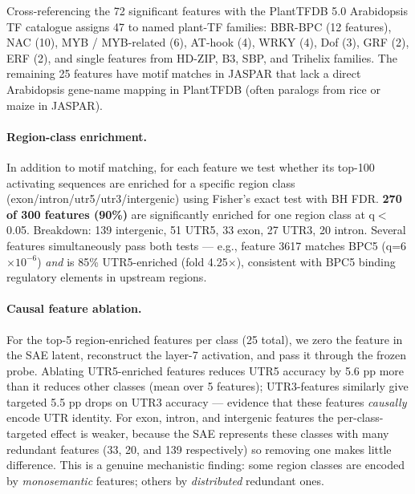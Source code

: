 \documentclass{article}
\begin{document}
Cross-referencing the 72 significant features with the PlantTFDB 5.0
Arabidopsis TF catalogue \citep{tian2020plantregmap} assigns 47 to named
plant-TF families: BBR-BPC (12 features), NAC (10), MYB / MYB-related (6),
AT-hook (4), WRKY (4), Dof (3), GRF (2), ERF (2), and single features from
HD-ZIP, B3, SBP, and Trihelix families. The remaining 25 features have
motif matches in JASPAR that lack a direct Arabidopsis gene-name mapping in
PlantTFDB (often paralogs from rice or maize in JASPAR).

\paragraph{Region-class enrichment.}
In addition to motif matching, for each feature we test whether its top-100
activating sequences are enriched for a specific region class
(exon/intron/utr5/utr3/intergenic) using Fisher's exact test with BH FDR.
\textbf{270 of 300 features (90\%)} are significantly enriched for one region
class at q$<$0.05. Breakdown: 139 intergenic, 51 UTR5, 33 exon, 27 UTR3, 20
intron. Several features simultaneously pass both tests --- e.g., feature
3617 matches BPC5 (q=6$\times 10^{-6}$) \emph{and} is 85\% UTR5-enriched
(fold 4.25$\times$), consistent with BPC5 binding regulatory elements in
upstream regions.

\paragraph{Causal feature ablation.}
For the top-5 region-enriched features per class (25 total), we zero the
feature in the SAE latent, reconstruct the layer-7 activation, and pass it
through the frozen probe. Ablating UTR5-enriched features reduces UTR5
accuracy by 5.6 pp more than it reduces other classes (mean over 5 features);
UTR3-features similarly give targeted 5.5 pp drops on UTR3 accuracy ---
evidence that these features \emph{causally} encode UTR identity. For exon,
intron, and intergenic features the per-class-targeted effect is weaker,
because the SAE represents these classes with many redundant features (33,
20, and 139 respectively) so removing one makes little difference. This is
a genuine mechanistic finding: some region classes are encoded by
\emph{monosemantic} features; others by \emph{distributed} redundant ones.
\end{document}
